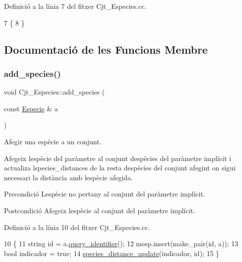 Definició a la línia 7 del fitxer Cjt\+\_\+\+Especies.\+cc.


\begin{DoxyCode}
7                            \{
8 \}
\end{DoxyCode}


\subsection{Documentació de les Funcions Membre}
\mbox{\label{class_cjt___especies_ab0aafd7fe0f24410a24aec9ff934bce0}} 
\subsubsection{\texorpdfstring{add\+\_\+species()}{add\_species()}}
{\footnotesize\ttfamily void Cjt\+\_\+\+Especies\+::add\+\_\+species (\begin{DoxyParamCaption}\item[{const \hyperlink{class_especie}{Especie} \&}]{a }\end{DoxyParamCaption})}



Afegir una espècie a un conjunt. 

Afegeix l\textquotesingle{}espècie del paràmetre al conjunt d\textquotesingle{}espècies del paràmetre implícit i actualiza l\textquotesingle{}species\+\_\+distances de la resta d\textquotesingle{}espècies del conjunt afegint on sigui necessari la distància amb l\textquotesingle{}espècie afegida.

\begin{DoxyPrecond}{Precondició}
L\textquotesingle{}espècie no pertany al conjunt del paràmetre implícit. 
\end{DoxyPrecond}
\begin{DoxyPostcond}{Postcondició}
Afegeix l\textquotesingle{}espècie al conjunt del paràmetre implícit. 
\end{DoxyPostcond}


Definició a la línia 10 del fitxer Cjt\+\_\+\+Especies.\+cc.


\begin{DoxyCode}
10                                                \{
11     \textcolor{keywordtype}{string} \textcolor{keywordtype}{id} = a.\hyperlink{class_especie_acfce0335ac5432dc681c2931b7986ace}{query\_identifier}();
12     mesp.insert(make\_pair(\textcolor{keywordtype}{id}, a));
13     \textcolor{keywordtype}{bool} indicador = \textcolor{keyword}{true};
14     \hyperlink{class_cjt___especies_a043f6ce127ac78eb891f6d004eee40b0}{species\_distance\_update}(indicador, \textcolor{keywordtype}{id});    
15 \}
\end{DoxyCode}
\mbox{\label{class_cjt___especies_ad72a47e0a785ac34f4908b54dd413d32}} 
